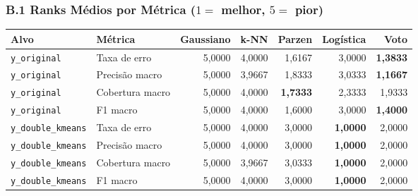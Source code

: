 \documentclass[a4paper,11pt]{article}
\begin{document}
\subsubsection*{\texorpdfstring{B.1 Ranks Médios por Métrica ($1 =$ melhor, $5 =$ pior)}{B.1 Ranks Médios por Métrica (1 = melhor, 5 = pior)}}\label{sec:b-1-ranks-medios-por-metrica-1-melhor-5-pior}


\begin{center}
\begin{minipage}{\linewidth}
\centering
{}
\small
\setlength{\tabcolsep}{5pt}
\renewcommand{\arraystretch}{1.18}
\begin{tabular}{l l r r r r r}
\toprule
\textbf{Alvo} & \textbf{Métrica} & \textbf{Gaussiano} & \textbf{k-NN} & \textbf{Parzen} & \textbf{Logística} & \textbf{Voto} \\
\midrule
\texttt{y\_\allowbreak original} & Taxa de erro & 5,0000 & 4,0000 & 1,6167 & 3,0000 & \textbf{1,3833} \\
\texttt{y\_\allowbreak original} & Precisão macro & 5,0000 & 3,9667 & 1,8333 & 3,0333 & \textbf{1,1667} \\
\texttt{y\_\allowbreak original} & Cobertura macro & 5,0000 & 4,0000 & \textbf{1,7333} & 2,3333 & 1,9333 \\
\texttt{y\_\allowbreak original} & F1 macro & 5,0000 & 4,0000 & 1,6000 & 3,0000 & \textbf{1,4000} \\
\texttt{y\_\allowbreak double\_\allowbreak kmeans} & Taxa de erro & 5,0000 & 4,0000 & 3,0000 & \textbf{1,0000} & 2,0000 \\
\texttt{y\_\allowbreak double\_\allowbreak kmeans} & Precisão macro & 5,0000 & 4,0000 & 3,0000 & \textbf{1,0000} & 2,0000 \\
\texttt{y\_\allowbreak double\_\allowbreak kmeans} & Cobertura macro & 5,0000 & 3,9667 & 3,0333 & \textbf{1,0000} & 2,0000 \\
\texttt{y\_\allowbreak double\_\allowbreak kmeans} & F1 macro & 5,0000 & 4,0000 & 3,0000 & \textbf{1,0000} & 2,0000 \\
\bottomrule
\end{tabular}
\end{minipage}
\end{center}


\end{document}
